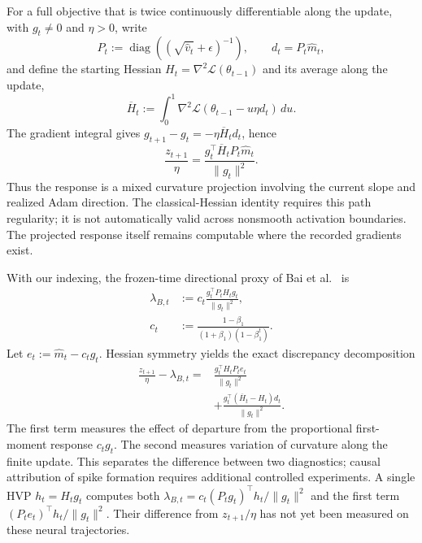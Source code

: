 For a full objective that is twice continuously differentiable along
the update, with $g_t\ne0$ and $\eta>0$, write
\begin{equation}
P_t:=\operatorname{diag}
\left((\sqrt{\widehat v_t}+\epsilon)^{-1}\right),
\qquad d_t=P_t\widehat m_t,
\end{equation}
and define the starting Hessian $H_t=\nabla^2\mathcal L(\theta_{t-1})$
and its average along the update,
\begin{equation}
\overline H_t:=
\int_0^1\nabla^2\mathcal L(\theta_{t-1}-u\eta d_t)\,du.
\end{equation}
The gradient integral gives
$g_{t+1}-g_t=-\eta\overline H_td_t$, hence
\begin{equation}
\frac{z_{t+1}}{\eta}
=
\frac{g_t^\top\overline H_tP_t\widehat m_t}{\|g_t\|^2}.
\label{eq:adam-response-integral}
\end{equation}
Thus the response is a mixed curvature projection involving the current
slope and realized Adam direction. The classical-Hessian identity requires
this path regularity; it is not automatically valid across nonsmooth
activation boundaries. The projected response itself remains computable
where the recorded gradients exist.

With our indexing, the frozen-time directional proxy of
Bai et al.~\cite{bai2026adaptive} is
\begin{equation}
\begin{aligned}
\lambda_{B,t}
&:=c_t\frac{g_t^\top P_tH_tg_t}{\|g_t\|^2},\\
c_t&:=\frac{1-\beta_1}{(1+\beta_1)(1-\beta_1^t)}.
\end{aligned}
\label{eq:adam-bai-reference}
\end{equation}
Let $e_t:=\widehat m_t-c_tg_t$. Hessian symmetry yields the exact
discrepancy decomposition
\begin{equation}
\begin{aligned}
\frac{z_{t+1}}{\eta}-\lambda_{B,t}
={}&\frac{g_t^\top H_tP_te_t}{\|g_t\|^2}\\
&+\frac{g_t^\top(\overline H_t-H_t)d_t}{\|g_t\|^2}.
\end{aligned}
\label{eq:adam-response-discrepancy}
\end{equation}
The first term measures the effect of departure from the proportional
first-moment response $c_tg_t$. The second measures variation of curvature
along the finite update. This separates the difference between two
diagnostics; causal attribution of spike formation requires additional
controlled experiments. A single HVP $h_t=H_tg_t$ computes both
$\lambda_{B,t}=c_t(P_tg_t)^\top h_t/\|g_t\|^2$ and the first term
$(P_te_t)^\top h_t/\|g_t\|^2$. Their difference from $z_{t+1}/\eta$
has not yet been measured on these neural trajectories.

